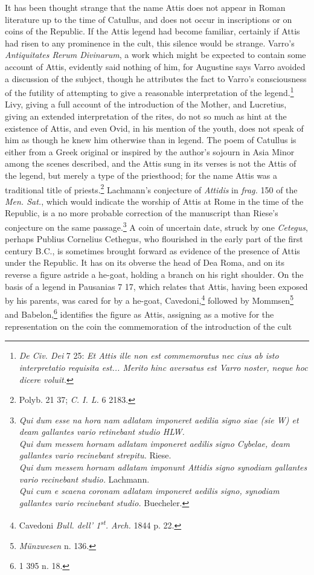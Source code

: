 \documentclass[a4paper, 11pt, oneside, polutonikogreek, english]{article}
\begin{document}
It has been thought strange that the name Attis does not appear in Roman literature up to the time of Catullus, and does not occur in inscriptions or on coins of the Republic. If the Attis legend had become familiar, certainly if Attis had risen to any prominence in the cult, this silence would be strange. Varro's \emph{Antiquitates Rerum Divinarum}, a work which might be expected to contain some account of Attis, evidently said nothing of him, for Augustine says Varro avoided a discussion of the subject, though he attributes the fact to Varro's consciousness of the futility of attempting to give a reasonable interpretation of the legend.\footnote{\emph{De Civ. Dei} 7 25: \emph{Et Attis ille non est commemoratus nec cius ab isto interpretatio requisita est... Merito hinc aversatus est Varro noster, neque hoc dicere voluit.}} Livy, giving a full account of the introduction of the Mother, and Lucretius, giving an extended interpretation of the rites, do not so much as hint at the existence of Attis, and even Ovid, in his mention of the youth, does not speak of him as though he knew him otherwise than in legend. The poem of Catullus is either from a Greek original or inspired by the author's sojourn in Asia Minor among the scenes described, and the Attis sung in its verses is not the Attis of the legend, but merely a type of the priesthood; for the name Attis was a traditional title of priests.\footnote{Polyb. 21 37; \emph{C. I. L.} 6 2183.} Lachmann's conjecture of \emph{Attidis} in \emph{frag.} 150 of the \emph{Men. Sat.}, which would indicate the worship of Attis at Rome in the time of the Republic, is a no more probable correction of the manuscript than Riese's conjecture on the same passage.\footnote{\emph{Qui dum esse na hora nam adlatam imponeret aedilia signo siae (sie W) et deam gallantes vario retinebant studio HLW.}\\\hspace*{10mm}\emph{Qui dum messem hornam adlatam imponeret aedilis signo Cybelae, deam gallantes vario recinebant strepitu.} Riese.\\\hspace*{10mm}\emph{Qui dum messem hornam adlatam imponunt Attidis signo synodiam gallantes vario recinebant studio.} Lachmann.\\\hspace*{10mm}\emph{Qui cum e scaena coronam adlatam imponeret aedilis signo, synodiam gallantes vario recinebant studio.} Buecheler.} A coin of uncertain date, struck by one \emph{Cetegus}, perhaps Publius Cornelius Cethegus, who flourished in the early part of the first century \textsc{B.C.}, is sometimes brought forward as evidence of the presence of Attis under the Republic. It has on its obverse the head of Dea Roma, and on its reverse a figure astride a he-goat, holding a branch on his right shoulder. On the basis of a legend in Pausanias 7 17, which relates that Attis, having been exposed by his parents, was cared for by a he-goat, Cavedoni,\footnote{Cavedoni \emph{Bull. dell' 1\textsuperscript{st}. Arch.} 1844 p. 22.} followed by Mommsen\footnote{\emph{Münzwesen} n. 136.} and Babelon,\footnote{1 395 n. 18.} identifies the figure as Attis, assigning as a motive for the representation on the coin the commemoration of the introduction of the cult 
\end{document}
